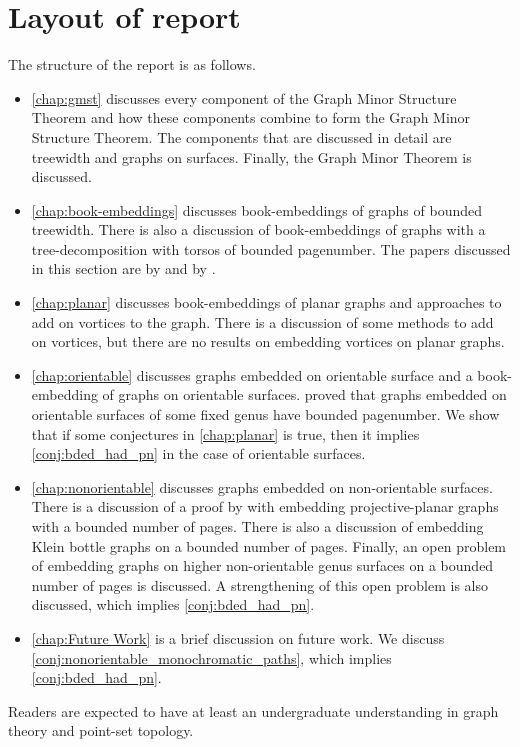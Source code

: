 \section{Layout of report}
The structure of the report is as follows.
\begin{itemize}
	\item \cref{chap:gmst} discusses every component of the Graph Minor Structure Theorem and how these components combine to form the Graph Minor Structure Theorem. The components that are discussed in detail are treewidth and graphs on surfaces. Finally, the Graph Minor Theorem is discussed.
	\item \cref{chap:book-embeddings} discusses book-embeddings of graphs of bounded treewidth. There is also a discussion of book-embeddings of graphs with a tree-decomposition with torsos of bounded pagenumber. The papers discussed in this section are by \textcite{hickingbothamStackNumberCliqueSum2023} and by \textcite{ganleyPagenumberTrees2001}. 
	\item \cref{chap:planar} discusses book-embeddings of planar graphs and approaches to add on vortices to the graph. There is a discussion of some methods to add on vortices, but there are no results on embedding vortices on planar graphs. 
	\item \cref{chap:orientable} discusses graphs embedded on orientable surface and a book-embedding of graphs on orientable surfaces. \textcite{heathPagenumberGenusGraphs1992} proved that graphs embedded on orientable surfaces of some fixed genus have bounded pagenumber. We show that if some conjectures in \cref{chap:planar} is true, then it implies \cref{conj:bded_had_pn} in the case of orientable surfaces. 
	\item \cref{chap:nonorientable} discusses graphs embedded on non-orientable surfaces. There is a discussion of a proof by \textcite{nakamotoBookEmbeddingProjectiveplanar2015} with embedding projective-planar graphs with a bounded number of pages. There is also a discussion of embedding Klein bottle graphs on a bounded number of pages. Finally, an open problem of embedding graphs on higher non-orientable genus surfaces on a bounded number of pages is discussed. A strengthening of this open problem is also discussed, which implies \cref{conj:bded_had_pn}.
	\item \cref{chap:Future Work} is a brief discussion on future work. We discuss \cref{conj:nonorientable_monochromatic_paths}, which implies \cref{conj:bded_had_pn}. 
\end{itemize}

Readers are expected to have at least an undergraduate understanding in graph theory and point-set topology. 
